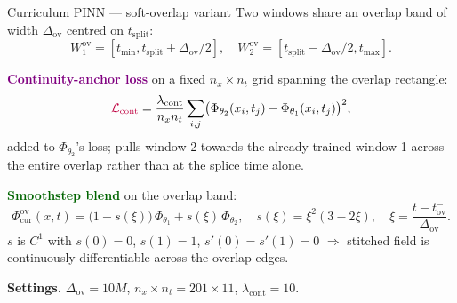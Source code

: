 \documentclass[aspectratio=169, 11pt]{beamer}
\begin{document}
\begin{frame}{Curriculum PINN --- soft-overlap variant}
  \footnotesize
  Two windows share an overlap band of width $\Delta_{\mathrm{ov}}$
  centred on $t_{\mathrm{split}}$:
  \[
    W_{1}^{\mathrm{ov}}=[t_{\min},t_{\mathrm{split}}+\Delta_{\mathrm{ov}}/2],\quad
    W_{2}^{\mathrm{ov}}=[t_{\mathrm{split}}-\Delta_{\mathrm{ov}}/2,t_{\max}].
  \]
  \medskip

  \textcolor{purple}{\textbf{Continuity-anchor loss}} on a fixed
  $n_{x}\!\times\!n_{t}$ grid spanning the overlap rectangle:
  \[
    \textcolor{purple}{\mathcal{L}_{\mathrm{cont}}}
    = \frac{\lambda_{\mathrm{cont}}}{n_{x} n_{t}}
      \sum_{i,j}\bigl(\Phi_{\theta_{2}}(x_{i},t_{j})-\Phi_{\theta_{1}}(x_{i},t_{j})\bigr)^{2},
  \]
  added to $\Phi_{\theta_{2}}$'s loss; pulls window 2 towards the
  already-trained window 1 across the entire overlap rather than
  at the splice time alone.
  \medskip

  \textcolor{darkgreen}{\textbf{Smoothstep blend}} on the overlap band:
  \[
    \Phi_{\mathrm{cur}}^{\mathrm{ov}}(x,t)
    = \bigl(1-s(\xi)\bigr)\,\Phi_{\theta_{1}} + s(\xi)\,\Phi_{\theta_{2}},
    \quad s(\xi)=\xi^{2}(3-2\xi),\quad
    \xi=\frac{t-t_{\mathrm{ov}}^{-}}{\Delta_{\mathrm{ov}}}.
  \]
  $s$ is $C^{1}$ with $s(0)\!=\!0$, $s(1)\!=\!1$, $s'(0)\!=\!s'(1)\!=\!0$
  $\Rightarrow$ stitched field is continuously differentiable across the
  overlap edges.
  \medskip

  \textbf{Settings.} $\Delta_{\mathrm{ov}}\!=\!10M$,
  $n_{x}\!\times\!n_{t}\!=\!201\!\times\!11$,
  $\lambda_{\mathrm{cont}}\!=\!10$.
\end{frame}
\end{document}
